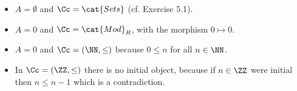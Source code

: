 \begin{examples*}
  \renewcommand{\labelitemi}{$\square$}
  \begin{itemize}
  \item $A=\emptyset$ and $\Cc=\cat{Sets}$ (cf. Exercise 5.1).
  \item $A=0$ and $\Cc=\cat{Mod}_R$, with the morphism $0\mapsto 0$.
  \item $A=0$ and $\Cc=(\NN,\leq)$ because $0\leq n$ for all $n\in\NN$.
  \end{itemize}
  \renewcommand{\labelitemi}{$\boxtimes$}
  \begin{itemize}
  \item In $\Cc=(\ZZ,\leq)$ there is no initial object, because if $n\in\ZZ$ were initial
    then $n\leq n-1$ which is a contradiction.
  \end{itemize}
\end{examples*}